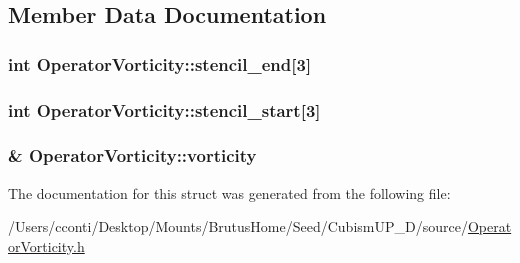 \subsection{Member Data Documentation}
\hypertarget{struct_operator_vorticity_af87676e305aa2c937a2ba0e7ee3882f1}{}
\subsubsection[{stencil\+\_\+end}]{\setlength{\rightskip}{0pt plus 5cm}int Operator\+Vorticity\+::stencil\+\_\+end\mbox{[}3\mbox{]}}\label{struct_operator_vorticity_af87676e305aa2c937a2ba0e7ee3882f1}
\hypertarget{struct_operator_vorticity_ae08cd818e465208f30592d422cabe9f0}{}
\subsubsection[{stencil\+\_\+start}]{\setlength{\rightskip}{0pt plus 5cm}int Operator\+Vorticity\+::stencil\+\_\+start\mbox{[}3\mbox{]}}\label{struct_operator_vorticity_ae08cd818e465208f30592d422cabe9f0}
\hypertarget{struct_operator_vorticity_a8612e8747d5eb6a0ab2f8064e9ba1ba7}{}
\subsubsection[{vorticity}]{\& Operator\+Vorticity\+::vorticity}\label{struct_operator_vorticity_a8612e8747d5eb6a0ab2f8064e9ba1ba7}


The documentation for this struct was generated from the following file\+:\begin{DoxyCompactItemize}
\item 
/\+Users/cconti/\+Desktop/\+Mounts/\+Brutus\+Home/\+Seed/\+Cubism\+U\+P\+\_\+D/source/\hyperlink{_operator_vorticity_8h}{Operator\+Vorticity.\+h}\end{DoxyCompactItemize}
